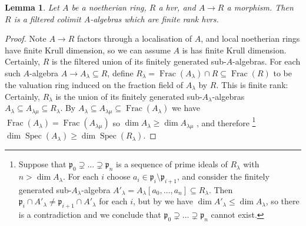 \documentclass[10pt]{amsart}
\newtheorem{lemm}[theo]{Lemma}
\theoremstyle{definition}
\newcommand{\p}{\mathfrak{p}}
\DeclareMathOperator{\Spec}{Spec}
\DeclareMathOperator{\Frac}{Frac}
\begin{document}
\begin{lemm} \label{lemm:hvrFinOK}
Let $A$ be a noetherian ring, $R$ a hvr, and $A \to R$ a morphism. Then $R$ is a filtered colimit $A$-algebras which are finite rank hvrs.
\end{lemm}

\begin{proof}
Note $A \to R$ factors through a localisation of $A$, and local noetherian rings have finite Krull dimension, so we can assume $A$ is has finite Krull dimension. Certainly, $R$ is the filtered union of its finitely generated sub-$A$-algebras. For each such $A$-algebra $A \to A_\lambda \subseteq R$, define $R_\lambda = \Frac(A_\lambda) \cap R \subseteq \Frac(R)$ to be the valuation ring induced on the fraction field of $A_\lambda$ by $R$. This is finite rank: Certainly, $R_\lambda$ is the union of its finitely generated sub-$A_\lambda$-algebras $A_\lambda \subseteq A_{\lambda \mu} \subseteq R_\lambda$. By $A_\lambda \subseteq A_{\lambda \mu} \subseteq \Frac(A_\lambda)$ we have $\Frac(A_\lambda) = \Frac(A_{\lambda \mu})$ so $\dim A_{\lambda} \geq \dim A_{\lambda \mu}$ \cite[Thm.5.5.8]{EGAIV2}, and therefore%
\footnote{Suppose that $\p_0 \supsetneq \dots \supsetneq \p_n$ is a sequence of prime ideals of $R_\lambda$ with $n > \dim A_\lambda$. For each $i$ choose $a_i \in \p_i \setminus \p_{i +1}$, and consider the finitely generated sub-$A_\lambda$-algebra $A'_\lambda = A_\lambda[a_0, \dots, a_n] \subseteq R_\lambda$. Then $\p_i \cap A'_\lambda \neq \p_{i+1} \cap A'_\lambda$ for each $i$, but by  \cite[Thm.5.5.8]{EGAIV2} we have $\dim A'_\lambda \leq \dim A_\lambda$, so there is a contradiction and we conclude that $\p_0 \supsetneq \dots \supsetneq \p_n$ cannot exist.
} %
$\dim \Spec(A_\lambda) \geq \dim \Spec(R_\lambda)$. 


\end{proof}
\end{document}

